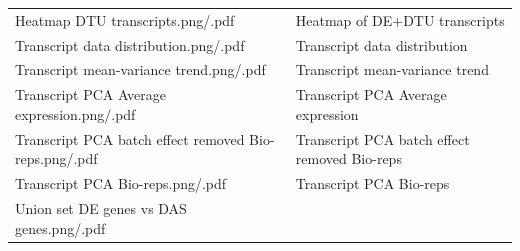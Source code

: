 \documentclass[]{article}
\begin{document}
\begin{longtable}[]{@{}ll@{}}
\begin{minipage}[t]{0.51\columnwidth}\raggedright\strut
Heatmap DTU transcripts.png/.pdf\strut
\end{minipage} & \begin{minipage}[t]{0.43\columnwidth}\raggedright\strut
Heatmap of DE+DTU transcripts\strut
\end{minipage}\tabularnewline
\begin{minipage}[t]{0.51\columnwidth}\raggedright\strut
Transcript data distribution.png/.pdf\strut
\end{minipage} & \begin{minipage}[t]{0.43\columnwidth}\raggedright\strut
Transcript data distribution\strut
\end{minipage}\tabularnewline
\begin{minipage}[t]{0.51\columnwidth}\raggedright\strut
Transcript mean-variance trend.png/.pdf\strut
\end{minipage} & \begin{minipage}[t]{0.43\columnwidth}\raggedright\strut
Transcript mean-variance trend\strut
\end{minipage}\tabularnewline
\begin{minipage}[t]{0.51\columnwidth}\raggedright\strut
Transcript PCA Average expression.png/.pdf\strut
\end{minipage} & \begin{minipage}[t]{0.43\columnwidth}\raggedright\strut
Transcript PCA Average expression\strut
\end{minipage}\tabularnewline
\begin{minipage}[t]{0.51\columnwidth}\raggedright\strut
Transcript PCA batch effect removed Bio-reps.png/.pdf\strut
\end{minipage} & \begin{minipage}[t]{0.43\columnwidth}\raggedright\strut
Transcript PCA batch effect removed Bio-reps\strut
\end{minipage}\tabularnewline
\begin{minipage}[t]{0.51\columnwidth}\raggedright\strut
Transcript PCA Bio-reps.png/.pdf\strut
\end{minipage} & \begin{minipage}[t]{0.43\columnwidth}\raggedright\strut
Transcript PCA Bio-reps\strut
\end{minipage}\tabularnewline
\begin{minipage}[t]{0.51\columnwidth}\raggedright\strut
Union set DE genes vs DAS genes.png/.pdf\strut
\end{minipage} & \begin{minipage}[t]{0.43\columnwidth}\raggedright\strut

\end{minipage}
\end{longtable}
\end{document}
